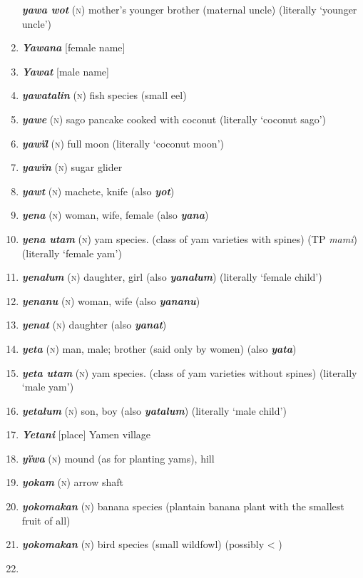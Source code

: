 \begin{enumerate}[noitemsep, label={}, align=left, widest=190, labelsep=1ex,leftmargin=*,itemindent=-10pt]
\textbf{\textit{yawa wot}} (\textsc{n}) mother’s younger brother (maternal uncle) (literally ‘younger uncle’) \item 
\textbf{\textit{Yawana}} [female name] \item 
\textbf{\textit{Yawat}} [male name] \item 
\textbf{\textit{yawatalin}} (\textsc{n}) fish species (small eel) \item 
\textbf{\textit{yawe}} (\textsc{n}) sago pancake cooked with coconut (literally ‘coconut sago’) \item 
\textbf{\textit{yawïl}} (\textsc{n}) full moon (literally ‘coconut moon’) \item 
\textbf{\textit{yawïn}} (\textsc{n}) sugar glider \item 
\textbf{\textit{yawt}} (\textsc{n}) machete, knife (also \textbf{\textit{yot}}) \item 
\textbf{\textit{yena}} (\textsc{n}) woman, wife, female (also \textbf{\textit{yana}}) \item 
\textbf{\textit{yena utam}} (\textsc{n}) yam species. (class of yam varieties with spines) (TP \textit{mami}) (literally ‘female yam’) \item 
\textbf{\textit{yenalum}} (\textsc{n}) daughter, girl (also \textbf{\textit{yanalum}}) (literally ‘female child’) \item 
\textbf{\textit{yenanu}} (\textsc{n}) woman, wife (also \textbf{\textit{yananu}}) \item 
\textbf{\textit{yenat}} (\textsc{n}) daughter (also \textbf{\textit{yanat}}) \item 
\textbf{\textit{yeta}} (\textsc{n}) man, male; brother (said only by women) (also \textbf{\textit{yata}}) \item 
\textbf{\textit{yeta utam}} (\textsc{n}) yam species. (class of yam varieties without spines) (literally ‘male yam’) \item 
\textbf{\textit{yetalum}} (\textsc{n}) son, boy (also \textbf{\textit{yatalum}}) (literally ‘male child’) \item 
\textbf{\textit{Yetani}} [place] Yamen village \item 
\textbf{\textit{yïwa}} (\textsc{n}) mound (as for planting yams), hill \item 
\textbf{\textit{yokam}} (\textsc{n}) arrow shaft \item 
\textbf{\textit{yokomakan}} (\textsc{n}) banana species (plantain banana plant with the smallest fruit of all) \item 
\textbf{\textit{yokomakan}} (\textsc{n}) bird species (small wildfowl) (possibly < ) \item 

\end{enumerate}
